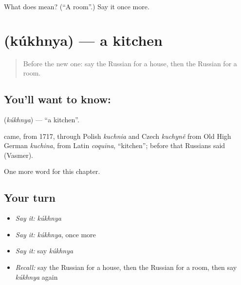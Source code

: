 \begin{tcolorbox}[breakable,colback=teal!4,colframe=teal!35!black,title={Before you move on}]
What does  mean? (\textquotedblleft{}A room\textquotedblright{}.) Say it once more.
\end{tcolorbox}
\section[\texorpdfstring{\ru{кухня} (kúkhnya)}{кухня (kúkhnya)}]{ (kúkhnya) — a kitchen}

\label{lesson:RU-C48-kitchen}



\begin{quote}
Before the new one: say the Russian for a house, then the Russian for a room.
\end{quote}

\subsection*{You'll want to know: }
\textbf{} (\emph{kúkhnya}) — \textquotedblleft{}a kitchen\textquotedblright{}.

\begin{cousinweb}
\textbf{} came, from 1717, through Polish \emph{kuchnia} and Czech \emph{kuchyně} from Old High German \emph{kuchina}, from Latin \emph{coquīna}, \textquotedblleft{}kitchen\textquotedblright{}; before that Russians said \emph{} (Vasmer).
\end{cousinweb}

\begin{grammarlens}[title={What you've built}]
One more word for this chapter.
\end{grammarlens}

\subsection*{Your turn}
\begin{itemize}
\raggedright
  \item \emph{Say it:} \emph{kúkhnya}
  \item \emph{Say it:} \emph{kúkhnya}, once more
  \item \emph{Say it:} say \emph{kúkhnya}
  \item \emph{Recall:} say the Russian for a house, then the Russian for a room, then say \emph{kúkhnya} again
\end{itemize}

